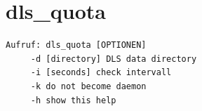 \documentclass[a4paper,12pt,BCOR6mm,bibtotoc,idxtotoc]{scrbook}
\begin{document}

\section{dls\_quota}
\label{sec:apx_cmd_quota}

\begin{lstlisting}
Aufruf: dls_quota [OPTIONEN]
     -d [directory] DLS data directory
     -i [seconds] check intervall
     -k do not become daemon
     -h show this help
\end{lstlisting}


\printindex
\end{document}
